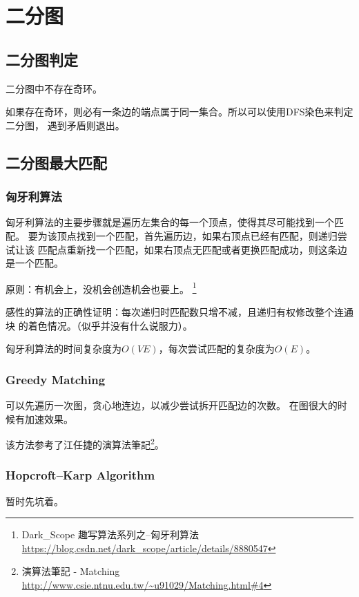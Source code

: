 \section{二分图}
\subsection{二分图判定}
\begin{property}
	二分图中不存在奇环。
\end{property}

如果存在奇环，则必有一条边的端点属于同一集合。所以可以使用DFS染色来判定二分图，
遇到矛盾则退出。



\subsection{二分图最大匹配}

\subsubsection{匈牙利算法}

匈牙利算法的主要步骤就是遍历左集合的每一个顶点，使得其尽可能找到一个匹配。
要为该顶点找到一个匹配，首先遍历边，如果右顶点已经有匹配，则递归尝试让该
匹配点重新找一个匹配，如果右顶点无匹配或者更换匹配成功，则这条边是一个匹配。

原则：有机会上，没机会创造机会也要上。
\footnote{Dark\_Scope 趣写算法系列之--匈牙利算法
	\url{https://blog.csdn.net/dark\_scope/article/details/8880547}}

感性的算法的正确性证明：每次递归时匹配数只增不减，且递归有权修改整个连通块
的着色情况。（似乎并没有什么说服力）。

匈牙利算法的时间复杂度为$O(VE)$，每次尝试匹配的复杂度为$O(E)$。


\subsubsection{Greedy Matching}
可以先遍历一次图，贪心地连边，以减少尝试拆开匹配边的次数。
在图很大的时候有加速效果。

该方法参考了江任捷的演算法筆記\footnote{
    演算法筆記 - Matching
    \url{http://www.csie.ntnu.edu.tw/\~u91029/Matching.html\#4}
}。
\subsubsection{Hopcroft–Karp Algorithm}
暂时先坑着。

